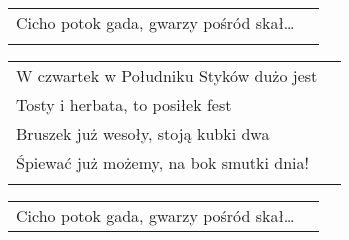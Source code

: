 \documentclass[a5paper]{article}
\begin{document}
\noindent
\begin{tabular}{@{}p{8.5cm}p{3cm}@{}} 
Cicho potok gada, gwarzy pośród skał…\\ \\
\end{tabular}

\noindent
\begin{tabular}{@{}p{9.5cm}p{3cm}@{}}
W czwartek w Południku Styków dużo jest \\
Tosty i herbata, to posiłek fest  \\
Bruszek już wesoły, stoją kubki dwa \\
Śpiewać już możemy, na bok smutki dnia! \\ \\
\end{tabular}

\noindent
\begin{tabular}{@{}p{8.5cm}p{3cm}@{}}
Cicho potok gada, gwarzy pośród skał…
\end{tabular}
\end{document}
